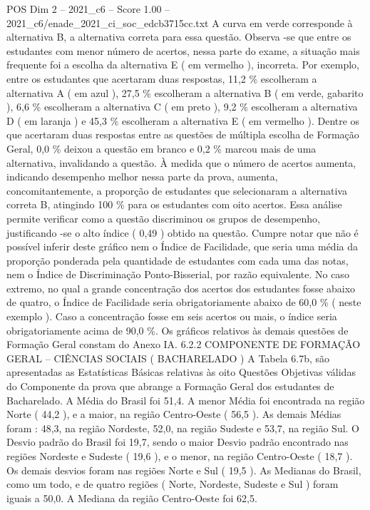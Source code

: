 \begin{textsample}{POS Dim 2 – 2021\_c6 – Score 1.00 – 2021\_c6/enade\_2021\_ci\_soc\_edcb3715cc.txt}
A curva em verde corresponde à alternativa B, a alternativa correta para essa questão.
Observa -se que entre os estudantes com menor número de acertos, nessa parte do exame, a situação mais frequente foi a escolha da alternativa E ( em vermelho ), incorreta.
Por exemplo, entre os estudantes que acertaram duas respostas, 11,2 \% escolheram a alternativa A ( em azul ), 27,5 \% escolheram a alternativa B ( em verde, gabarito ), 6,6 \% escolheram a alternativa C ( em preto ), 9,2 \% escolheram a alternativa D ( em laranja ) e 45,3 \% escolheram a alternativa E ( em vermelho ).
Dentre os que acertaram duas respostas entre as questões de múltipla escolha de Formação Geral, 0,0 \% deixou a questão em branco e 0,2 \% marcou mais de uma alternativa, invalidando a questão.
À medida que o número de acertos aumenta, indicando desempenho melhor nessa parte da prova, aumenta, concomitantemente, a proporção de estudantes que selecionaram a alternativa correta B, atingindo 100 \% para os estudantes com oito acertos.
Essa análise permite verificar como a questão discriminou os grupos de desempenho, justificando -se o alto índice ( 0,49 ) obtido na questão.
Cumpre notar que não é possível inferir deste gráfico nem o Índice de Facilidade, que seria uma média da proporção ponderada pela quantidade de estudantes com cada uma das notas, nem o Índice de Discriminação Ponto-Bisserial, por razão equivalente.
No caso extremo, no qual a grande concentração dos acertos dos estudantes fosse abaixo de quatro, o Índice de Facilidade seria obrigatoriamente abaixo de 60,0 \% ( neste exemplo ).
Caso a concentração fosse em seis acertos ou mais, o índice seria obrigatoriamente acima de 90,0 \%.
Os gráficos relativos às demais questões de Formação Geral constam do Anexo IA. 6.2.2 COMPONENTE DE FORMAÇÃO GERAL – CIÊNCIAS SOCIAIS ( BACHARELADO ) A Tabela 6.7b, são apresentadas as Estatísticas Básicas relativas às oito Questões Objetivas válidas do Componente da prova que abrange a Formação Geral dos estudantes de Bacharelado.
A Média do Brasil foi 51,4.
A menor Média foi encontrada na região Norte ( 44,2 ), e a maior, na região Centro-Oeste ( 56,5 ).
As demais Médias foram : 48,3, na região Nordeste, 52,0, na região Sudeste e 53,7, na região Sul.
O Desvio padrão do Brasil foi 19,7, sendo o maior Desvio padrão encontrado nas regiões Nordeste e Sudeste ( 19,6 ), e o menor, na região Centro-Oeste ( 18,7 ).
Os demais desvios foram nas regiões Norte e Sul ( 19,5 ).
As Medianas do Brasil, como um todo, e de quatro regiões ( Norte, Nordeste, Sudeste e Sul ) foram iguais a 50,0.
A Mediana da região Centro-Oeste foi 62,5.

\end{textsample}
